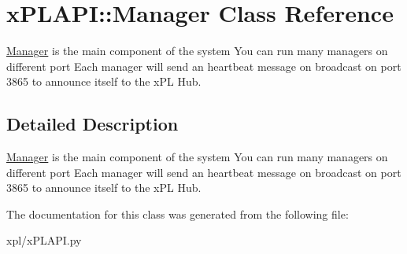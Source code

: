 \hypertarget{classxPLAPI_1_1Manager}{
\section{xPLAPI::Manager Class Reference}
\label{classxPLAPI_1_1Manager}
}
\hyperlink{classxPLAPI_1_1Manager}{Manager} is the main component of the system You can run many managers on different port Each manager will send an heartbeat message on broadcast on port 3865 to announce itself to the xPL Hub.  




\subsection{Detailed Description}
\hyperlink{classxPLAPI_1_1Manager}{Manager} is the main component of the system You can run many managers on different port Each manager will send an heartbeat message on broadcast on port 3865 to announce itself to the xPL Hub. 

The documentation for this class was generated from the following file:\begin{CompactItemize}
\item 
xpl/xPLAPI.py\end{CompactItemize}
